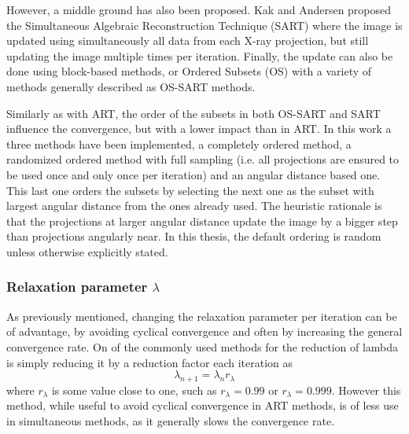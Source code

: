 However, a middle ground has also been proposed. Kak and Andersen proposed\cite{SART} the Simultaneous Algebraic Reconstruction Technique (SART) where the image is updated using simultaneously all data from each X-ray projection, but still updating the image multiple times per iteration. Finally, the update can also be done using block-based methods, or Ordered Subsets (OS) with a variety of methods generally described as OS-SART methods\cite{OS_SART}\cite{wang2004ordered}. 

 Similarly as with ART, the order of the subsets in both OS-SART and SART influence the convergence, but with a lower impact than in ART. In this work a three methods have been implemented, a completely ordered method, a randomized ordered method with full sampling (i.e. all projections are ensured to be used once and only once per iteration) and an angular distance based one. This last one orders the subsets by selecting the next one as the subset with largest angular distance from the ones already used. The heuristic rationale is that the projections at larger angular distance update the image by a bigger step than projections angularly near. In this thesis, the default ordering is random unless otherwise explicitly stated.
 



\subsubsection{Relaxation parameter $\lambda$}

As previously mentioned, changing the relaxation parameter per iteration can be of advantage, by avoiding cyclical convergence and often by increasing the general convergence rate. On of the commonly used methods for the reduction of lambda is simply reducing it by a reduction factor each iteration as
\begin{equation}
\lambda_{n+1}=\lambda_n r_\lambda
\end{equation}
where $r_\lambda$ is some value close to one, such as $r_\lambda=0.99$ or $r_\lambda=0.999$.  However this method, while useful to avoid cyclical convergence in ART methods, is of less use in simultaneous methods, as it generally slows the convergence rate.%

